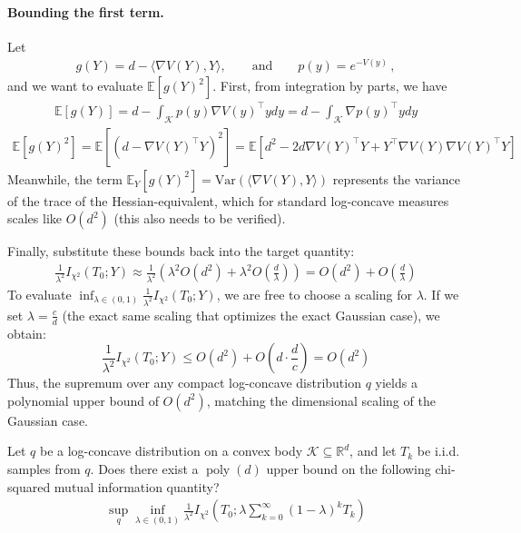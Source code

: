 \documentclass{article}
\theoremstyle{plain}
\theoremstyle{definition}
\theoremstyle{plain}
\newcommand{\Rd}{\mathbb{R}^d}
\newcommand{\E}{\mathbb E}
\newcommand{\cK}{\mathcal K}
\newcommand{\poly}{\operatorname{poly}}
\begin{document}
\paragraph{Bounding the first term.}
Let
\begin{align}
    g(Y) = d - \langle \nabla V(Y), Y \rangle, \qquad \text{and} \qquad p(y) = e^{-V(y)}\,,
\end{align}
and we want to evaluate $\E[g(Y)^2]$.
First, from integration by parts, we have
\begin{align}
    \E[g(Y)] = d - \int_{\cK} p(y) \nabla V(y)^\top y dy = d - \int_\cK \nabla p(y)^\top y dy
\end{align}
\begin{align}
    \E[g(Y)^2] = \E\left[
        (d - \nabla V(Y)^\top Y)^2
        \right]
    = \E\left[
        d^2 - 2d\nabla V(Y)^\top Y + Y^\top \nabla V(Y) \nabla V(Y)^\top Y
        \right]
\end{align}
Meanwhile, the term $\E_Y[g(Y)^2] = \text{Var}(\langle \nabla V(Y), Y \rangle)$ represents the variance of the trace of the Hessian-equivalent, which for standard log-concave measures scales like $O(d^2)$ (this also needs to be verified).

Finally, substitute these bounds back into the target quantity:
\begin{align}
    \frac{1}{\lambda^2} I_{\chi^2}(T_0; Y) \approx \frac{1}{\lambda^2} \left( \lambda^2 O(d^2) + \lambda^2 O\left(\frac{d}{\lambda}\right) \right) = O(d^2) + O\left(\frac{d}{\lambda}\right)
\end{align}
To evaluate $\inf_{\lambda \in (0,1)} \frac{1}{\lambda^2} I_{\chi^2}(T_0; Y)$, we are free to choose a scaling for $\lambda$. If we set $\lambda = \frac{c}{d}$ (the exact same scaling that optimizes the exact Gaussian case), we obtain:$$\frac{1}{\lambda^2} I_{\chi^2}(T_0; Y) \le O(d^2) + O\left( d \cdot \frac{d}{c} \right) = O(d^2)$$Thus, the supremum over any compact log-concave distribution $q$ yields a polynomial upper bound of $O(d^2)$, matching the dimensional scaling of the Gaussian case.

\newpage
Let $q$ be a log-concave distribution on a convex body $\cK\subseteq \Rd$, and let $T_k$ be i.i.d. samples from $q$.
Does there exist a $\poly(d)$ upper bound on the following chi-squared mutual information quantity?
\begin{align}
    \sup_{q} \inf_{\lambda\in(0,1)} \frac{1}{\lambda^2} I_{\chi^2}\left(T_0; \lambda \sum_{k=0}^\infty (1-\lambda)^k T_k\right)
\end{align}
\end{document}
